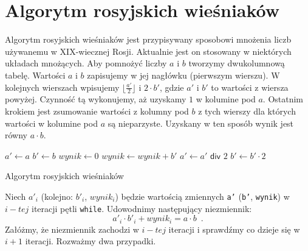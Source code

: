 \section{Algorytm rosyjskich wieśniaków}

Algorytm rosyjskich wieśniaków jest przypisywany sposobowi mnożenia liczb używanemu w XIX-wiecznej Rosji.
Aktualnie jest on stosowany w niektórych układach mnożących.
Aby pomnożyć liczby $a$ i $b$ tworzymy dwukolumnową tabelę.
Wartości $a$ i $b$ zapisujemy w jej nagłówku (pierwszym wierszu).
W kolejnych wierszach wpisujemy $\lfloor\frac{a'}{2}\rfloor$ i $2 \cdot b'$, gdzie $a'$ i $b'$ to wartości z wiersza powyżej. 
Czynność tą wykonujemy, aż uzyskamy $1$ w kolumine pod $a$. 
Ostatnim krokiem jest zsumowanie wartości z kolumny pod $b$ z tych wierszy dla których wartości w kolumine pod $a$ są nieparzyste.
Uzyskany w ten sposób wynik jest równy $a \cdot b$.

\begin{algorithm}[h]
  \DontPrintSemicolon
  
  
  
  $a' \leftarrow a$\;
  $b' \leftarrow b$\;
  $wynik \leftarrow 0$\;
  {
    {
      $wynik \leftarrow wynik + b'$\;
    }
    $a' \leftarrow a' \textsf{ div } 2$\;
    $b' \leftarrow b' \cdot 2$\;
  }
  
  \caption{Algorytm rosyjskich wieśniaków}
  \label{alg-wiesniakow}
\end{algorithm}

Niech $a'_i$ (kolejno: $b'_i$, $wynik_i$) będzie wartością zmiennych \texttt{a'} (\texttt{b'}, \texttt{wynik}) w $i-tej$ iteracji pętli \texttt{while}. 
Udowodnimy następujący niezmiennik:
\[
a'_i \cdot b'_i + wynik_i = a \cdot b \enspace.
\]
Załóżmy, że niezmiennik zachodzi w $i-tej$ iteracji i sprawdźmy co dzieje się w $i+1$ iteracji.
Rozważmy dwa przypadki.


